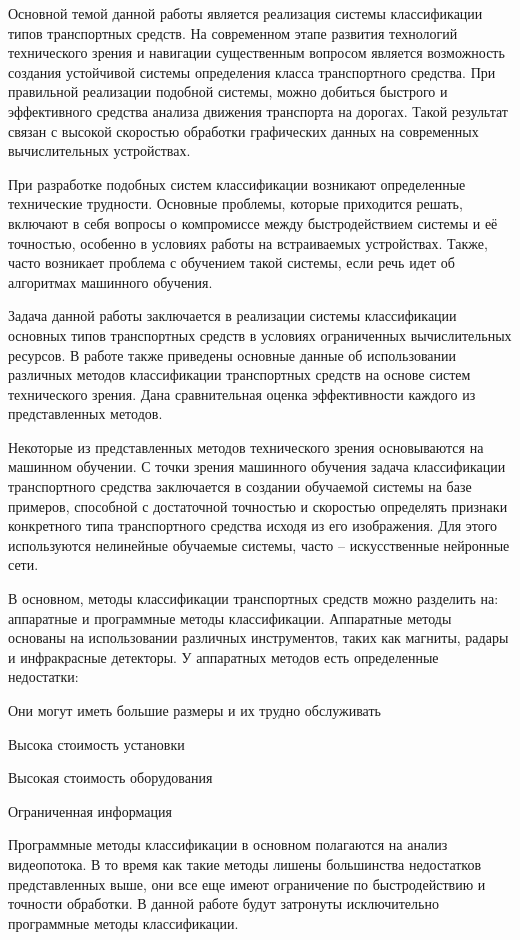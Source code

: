 \intro

Основной темой данной работы является реализация системы классификации типов транспортных средств. На современном этапе развития технологий технического зрения и навигации существенным вопросом является возможность создания устойчивой системы определения класса транспортного средства. При правильной реализации подобной системы, можно добиться быстрого и эффективного средства анализа движения транспорта на дорогах. Такой результат связан с высокой скоростью обработки графических данных на современных вычислительных устройствах. 

При разработке подобных систем классификации возникают определенные технические трудности. Основные проблемы, которые приходится решать, включают в себя вопросы о компромиссе между быстродействием системы и её точностью, особенно в условиях работы на встраиваемых устройствах. Также, часто возникает проблема с обучением такой системы, если речь идет об алгоритмах машинного обучения.

Задача данной работы заключается в реализации системы классификации основных типов транспортных средств в условиях ограниченных вычислительных ресурсов. В работе также приведены основные данные об использовании различных методов классификации транспортных средств на основе систем технического зрения. Дана сравнительная оценка эффективности каждого из представленных методов. 

Некоторые из представленных методов технического зрения основываются на машинном обучении. С точки зрения машинного обучения задача классификации транспортного средства заключается в создании обучаемой системы на базе примеров, способной с достаточной точностью и скоростью определять признаки конкретного типа транспортного средства исходя из его изображения. Для этого используются нелинейные обучаемые системы, часто – искусственные нейронные сети. 

В основном, методы классификации транспортных средств можно разделить на: аппаратные и программные методы классификации. Аппаратные методы основаны на использовании различных инструментов, таких как магниты, радары и инфракрасные детекторы. У аппаратных методов есть определенные недостатки:
%
\begin{itemize*}
  \item Они могут иметь большие размеры и их трудно обслуживать
  \item Высока стоимость установки
  \item Высокая стоимость оборудования
  \item Ограниченная информация
\end{itemize*}
%

Программные методы классификации в основном полагаются на анализ видеопотока. В то время как такие методы лишены большинства недостатков представленных выше, они все еще имеют ограничение по быстродействию и точности обработки. В данной работе будут затронуты исключительно программные методы классификации.

